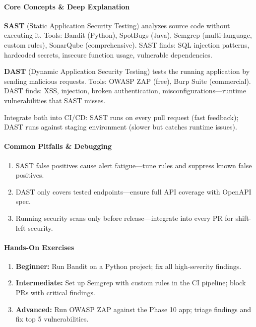 \documentclass[11pt, a4paper, oneside]{report}
\begin{document}
\paragraph{Core Concepts \& Deep Explanation} \textbf{SAST} (Static Application Security Testing) analyzes source code without executing it. Tools: Bandit (Python), SpotBugs (Java), Semgrep (multi-language, custom rules), SonarQube (comprehensive). SAST finds: SQL injection patterns, hardcoded secrets, insecure function usage, vulnerable dependencies.

\textbf{DAST} (Dynamic Application Security Testing) tests the running application by sending malicious requests. Tools: OWASP ZAP (free), Burp Suite (commercial). DAST finds: XSS, injection, broken authentication, misconfigurations---runtime vulnerabilities that SAST misses.

Integrate both into CI/CD: SAST runs on every pull request (fast feedback); DAST runs against staging environment (slower but catches runtime issues).

\paragraph{Common Pitfalls \& Debugging}
\begin{enumerate}[leftmargin=*]
\item SAST false positives cause alert fatigue---tune rules and suppress known false positives.
\item DAST only covers tested endpoints---ensure full API coverage with OpenAPI spec.
\item Running security scans only before release---integrate into every PR for shift-left security.
\end{enumerate}

\paragraph{Hands-On Exercises}
\begin{enumerate}[leftmargin=*]
\item \textbf{Beginner:} Run Bandit on a Python project; fix all high-severity findings.
\item \textbf{Intermediate:} Set up Semgrep with custom rules in the CI pipeline; block PRs with critical findings.
\item \textbf{Advanced:} Run OWASP ZAP against the Phase 10 app; triage findings and fix top 5 vulnerabilities.
\end{enumerate}
\end{document}

